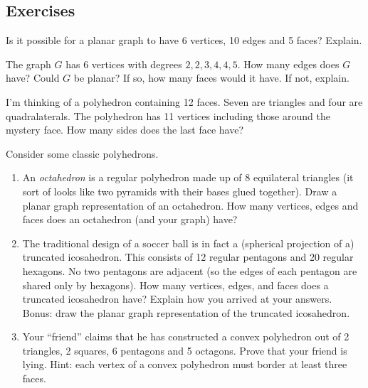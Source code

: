 \documentclass[10pt,]{book}
\theoremstyle{plain}
\theoremstyle{definition}
\theoremstyle{definition}
\theoremstyle{definition}
\theoremstyle{definition}
\numberwithin{equation}{chapter}
\begin{document}
\subsection*{Exercises}\label{exercises_gt-planar}
\begin{divisionexercise}{1}\hypertarget{exercise-30}{}
\hypertarget{p-283}{}%
Is it possible for a planar graph to have 6 vertices, 10 edges and 5 faces? Explain.%
\end{divisionexercise}%
\begin{divisionexercise}{2}\hypertarget{exercise-31}{}
\hypertarget{p-285}{}%
The graph \(G\) has 6 vertices with degrees \(2, 2, 3, 4, 4, 5\). How many edges does \(G\) have? Could \(G\) be planar? If so, how many faces would it have.  If not, explain.%
\end{divisionexercise}%
\begin{divisionexercise}{3}\hypertarget{exercise-32}{}
\hypertarget{p-287}{}%
I'm thinking of a polyhedron containing 12 faces. Seven are triangles and four are quadralaterals. The polyhedron has 11 vertices including those around the mystery face. How many sides does the last face have?%
\end{divisionexercise}%
\begin{divisionexercise}{4}\hypertarget{exercise-33}{}
\hypertarget{p-289}{}%
Consider some classic polyhedrons. \leavevmode%
\begin{enumerate}[label=(\alph*)]
\item\hypertarget{li-78}{}\hypertarget{p-290}{}%
An \emph{octahedron} is a regular polyhedron made up of 8 equilateral triangles (it sort of looks like two pyramids with their bases glued together). Draw a planar graph representation of an octahedron. How many vertices, edges and faces does an octahedron (and your graph) have? %
\item\hypertarget{li-79}{}\hypertarget{p-291}{}%
The traditional design of a soccer ball is in fact a (spherical projection of a) truncated icosahedron. This consists of 12 regular pentagons and 20 regular hexagons. No two pentagons are adjacent (so the edges of each pentagon are shared only by hexagons). How many vertices, edges, and faces does a truncated icosahedron have? Explain how you arrived at your answers. Bonus: draw the planar graph representation of the truncated icosahedron. %
\item\hypertarget{li-80}{}\hypertarget{p-292}{}%
Your ``friend'' claims that he has constructed a convex polyhedron out of 2 triangles, 2 squares, 6 pentagons and 5 octagons. Prove that your friend is lying. Hint: each vertex of a convex polyhedron must border at least three faces. %
\end{enumerate}
%
\end{divisionexercise}%
\end{document}
